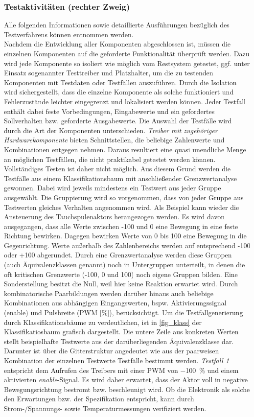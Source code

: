 \subsubsection{Testaktivitäten (rechter Zweig)}
Alle folgenden Informationen sowie detaillierte Ausführungen bezüglich des Testverfahrens können \cite{BasSof} entnommen werden.\\
Nachdem die Entwicklung aller Komponenten abgeschlossen ist, müssen die einzelnen Komponenten auf die geforderte Funktionalität überprüft werden. Dazu wird jede Komponente so isoliert wie möglich vom Restsystem getestet, ggf. unter Einsatz sogenannter Testtreiber und Platzhalter, um die zu testenden Komponenten mit Testdaten oder Testfällen auszuführen. Durch die Isolation wird sichergestellt, dass die einzelne Komponente als solche funktioniert und Fehlerzustände leichter eingegrenzt und lokalisiert werden können. Jeder Testfall enthält dabei feste Vorbedingungen, Eingabewerte und ein gefordertes Sollverhalten bzw. geforderte Ausgabewerte. Die Auswahl der Testfälle wird durch die Art der Komponenten unterschieden. \textit{Treiber mit zugehöriger Hardwarekomponente} bieten Schnittstellen, die beliebige Zahlenwerte und Kombinationen entgegen nehmen. Daraus resultiert eine quasi unendliche Menge an möglichen Testfällen, die nicht praktikabel getestet werden können. Vollständiges Testen ist daher nicht möglich. Aus diesem Grund werden die Testfälle aus einem Klassifikationsbaum mit anschließender Grenzwertanalyse gewonnen. Dabei wird jeweils mindestens ein Testwert aus jeder Gruppe ausgewählt. Die Gruppierung wird so vorgenommen, dass von jeder Gruppe aus Testwerten gleiches Verhalten angenommen wird. Als Beispiel kann wieder die Ansteuerung des Tauchspulenaktors herangezogen werden. Es wird davon ausgegangen, dass alle Werte zwischen -100 und 0 eine Bewegung in eine feste Richtung bewirken. Dagegen bewirken Werte von 0 bis 100 eine Bewegung in die Gegenrichtung. Werte außerhalb des Zahlenbereichs werden auf entsprechend -100 oder +100 abgerundet. Durch eine Grenzwertanalyse werden diese Gruppen (auch Äquivalenzklassen genannt) noch in Untergruppen unterteilt, in denen die oft kritischen Grenzwerte (-100, 0 und 100) noch eigene Gruppen bilden. Eine Sonderstellung besitzt die Null, weil hier keine Reaktion erwartet wird. Durch kombinatorische Paarbildungen werden darüber hinaus auch beliebige Kombinationen aus abhängigen Eingangswerten, bspw. Aktivierungssignal (enable) und Pulsbreite (PWM [\%]), berücksichtigt. Um die Testfallgenerierung durch Klassifikationsbäume zu verdeutlichen, ist in \autoref{fig_klass} der Klassifikatiosbaum grafisch dargestellt. Die untere Zeile aus konkreten Werten stellt beispielhafte Testwerte aus der darüberliegenden Äquivalenzklasse dar. Darunter ist über die Gitterstruktur angedeutet wie aus der paarweisen Kombination der einzelnen Testwerte Testfälle bestimmt werden. \textit{Testfall 1} entspricht dem Aufrufen des Treibers mit einer PWM von \SI{-100}{\%} und einem aktivierten \textit{enable}-Signal. Es wird daher erwartet, dass der Aktor voll in \glqq negative\grqq{} Bewegungsrichtung bestromt bzw. beschleunigt wird. Ob die Elektronik als solche den Erwartungen bzw. der Spezifikation entspricht, kann durch Strom-/Spannungs- sowie Temperaturmessungen verifiziert werden. 
